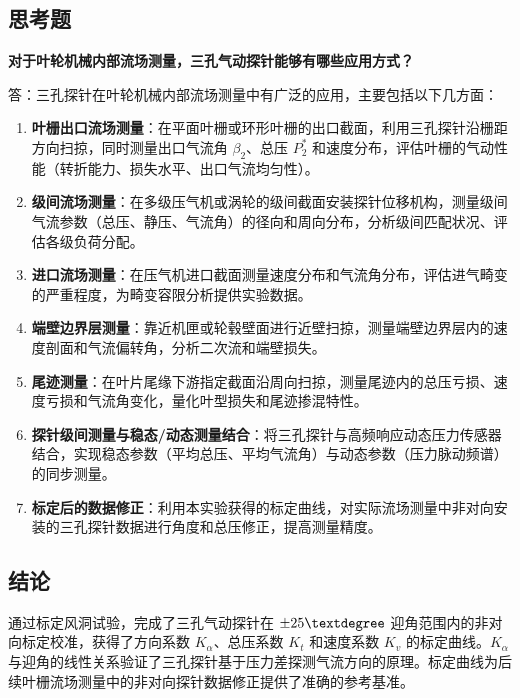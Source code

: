 \subsection{思考题}

\textbf{对于叶轮机械内部流场测量，三孔气动探针能够有哪些应用方式？}

答：三孔探针在叶轮机械内部流场测量中有广泛的应用，主要包括以下几方面：

\begin{enumerate}
    \item \textbf{叶栅出口流场测量}：在平面叶栅或环形叶栅的出口截面，利用三孔探针沿栅距方向扫掠，同时测量出口气流角 $\beta_2$、总压 $P_2^*$ 和速度分布，评估叶栅的气动性能（转折能力、损失水平、出口气流均匀性）。

    \item \textbf{级间流场测量}：在多级压气机或涡轮的级间截面安装探针位移机构，测量级间气流参数（总压、静压、气流角）的径向和周向分布，分析级间匹配状况、评估各级负荷分配。

    \item \textbf{进口流场测量}：在压气机进口截面测量速度分布和气流角分布，评估进气畸变的严重程度，为畸变容限分析提供实验数据。

    \item \textbf{端壁边界层测量}：靠近机匣或轮毂壁面进行近壁扫掠，测量端壁边界层内的速度剖面和气流偏转角，分析二次流和端壁损失。

    \item \textbf{尾迹测量}：在叶片尾缘下游指定截面沿周向扫掠，测量尾迹内的总压亏损、速度亏损和气流角变化，量化叶型损失和尾迹掺混特性。

    \item \textbf{探针级间测量与稳态/动态测量结合}：将三孔探针与高频响应动态压力传感器结合，实现稳态参数（平均总压、平均气流角）与动态参数（压力脉动频谱）的同步测量。

    \item \textbf{标定后的数据修正}：利用本实验获得的标定曲线，对实际流场测量中非对向安装的三孔探针数据进行角度和总压修正，提高测量精度。
\end{enumerate}

\subsection{结论}

通过标定风洞试验，完成了三孔气动探针在 $\pm 25\textdegree$ 迎角范围内的非对向标定校准，获得了方向系数 $K_\alpha$、总压系数 $K_t$ 和速度系数 $K_v$ 的标定曲线。$K_\alpha$ 与迎角的线性关系验证了三孔探针基于压力差探测气流方向的原理。标定曲线为后续叶栅流场测量中的非对向探针数据修正提供了准确的参考基准。
